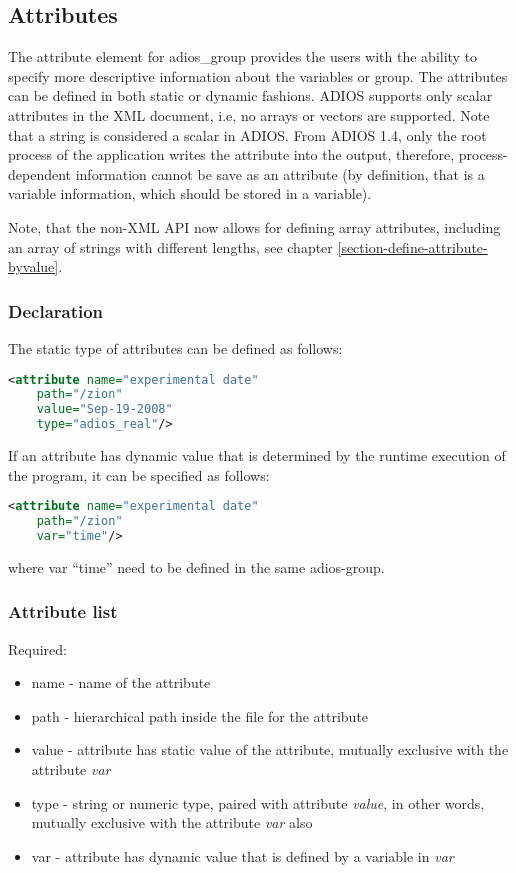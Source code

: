 \subsection{Attributes}
\label{chapter-xml-attributes}
The attribute element for adios\_group provides the users with the ability to specify 
more descriptive information about the variables or group. The attributes can be 
defined in both static or dynamic fashions. ADIOS supports only scalar attributes in the XML document, i.e, 
no arrays or vectors are supported. Note that a string is considered a scalar in ADIOS. 
From ADIOS 1.4, only the root process of the application writes the attribute into 
the output, therefore, process-dependent information cannot be save as an attribute 
(by definition, that is a variable information, which should be stored in a variable).

Note, that the non-XML API now allows for defining array attributes, including an array of strings with different lengths, see chapter \ref{section-define-attribute-byvalue}. 

\subsubsection{Declaration}

The static type of attributes can be defined as follows:
\begin{lstlisting}[language=XML]
<attribute name="experimental date"
    path="/zion"
    value="Sep-19-2008" 
    type="adios_real"/>
\end{lstlisting}

If an attribute has dynamic value that is determined by the runtime execution of 
the program, it can be specified as follows:
\begin{lstlisting}[language=XML]
<attribute name="experimental date"
    path="/zion"
    var="time"/>
\end{lstlisting}
where var ``time'' need to be defined in the same adios-group.

\subsubsection{Attribute list}

Required:
\begin{itemize}
\item name -  name of the attribute
\item path - hierarchical path inside the file for the attribute
\item value - attribute has static value of the attribute, mutually exclusive with the  attribute \textit{var}
\item type - string or numeric type, paired with attribute \textit{value}, in other words, mutually exclusive with the attribute \textit{var} also
\item var - attribute has dynamic value that is defined by a variable in \textit{var}
\end{itemize}

